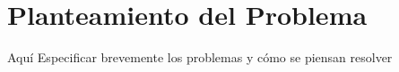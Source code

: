 \section{Planteamiento del Problema}
Aquí Especificar brevemente los problemas y cómo se piensan resolver

